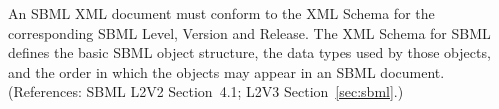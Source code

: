 An SBML XML document must conform to the XML Schema for the corresponding
SBML Level, Version and Release.  The XML Schema for SBML defines the basic
SBML object structure, the data types used by those objects, and the order
in which the objects may appear in an SBML document.  (References: SBML
L2V2 Section~4.1; L2V3 Section~\ref{sec:sbml}.)
